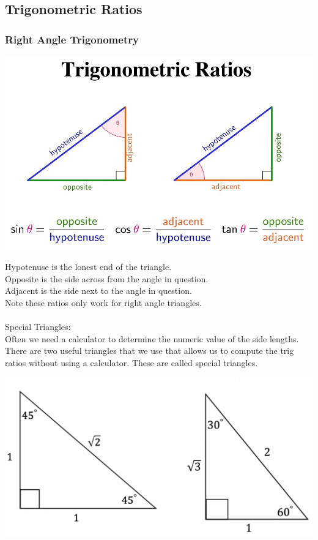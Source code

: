 \subsection{Trigonometric Ratios}

\subsubsection{Right Angle Trigonometry}
\centerline{\includegraphics[scale=0.3]{FundamentalsPictures/TrigRatios.jpg}}
Hypotenuse is the lonest end of the triangle.\\
Opposite is the side across from the angle in question.\\
Adjacent is the side next to the angle in question.\\
Note these ratios only work for right angle triangles.\\
\\
Special Triangles:\\
Often we need a calculator to determine the numeric value of the side lengths. There are two useful triangles that we use that allows us to compute the trig ratios without using a calculator. These are called special triangles.\\
\centerline{\includegraphics[scale=0.5]{FundamentalsPictures/SpecialTriangles.png}}

